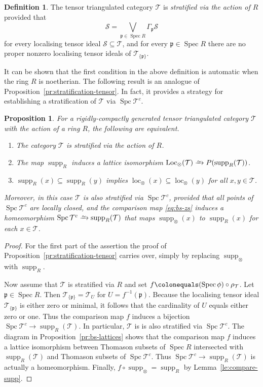 \documentclass{amsart}[a4]
\newtheorem{proposition}[theorem]{Proposition}
\theoremstyle{definition}
\newtheorem{definition}[theorem]{Definition}
\theoremstyle{remark}
\numberwithin{equation}{section}
\newcommand{\loc}{\operatorname{loc}}
\newcommand{\Loc}{\operatorname{Loc}}
\newcommand{\Spc}{\operatorname{Spc}}
\newcommand{\Spec}{\operatorname{Spec}}
\newcommand{\supp}{\operatorname{supp}}
\newcommand{\iso}{\xrightarrow{\raisebox{-.6ex}[0ex][0ex]{$\scriptstyle{\sim}$}}}
\newcommand{\cat}{\mathcal}
\newcommand{\fp}{\mathfrak{p}}
\let\Gamma\varGamma
\begin{document}
\begin{definition}
  The tensor triangulated category $\cat T$ is \emph{stratified via
    the action of $R$} provided that
  \[\cat S=\bigvee_{\fp\in\Spec R}\Gamma_\fp\cat S\] for every
  localising tensor ideal $\cat S\subseteq \cat T$, and for every
  $\fp\in\Spec R$ there are no proper nonzero localising tensor ideals
  of $\cat T_{\{\fp\}}$.
\end{definition}

It can be shown that the first condition in the above definition is
automatic when the ring $R$ is noetherian. The following result is an
analogue of Proposition~\ref{pr:stratification-tensor}. In fact, it
provides a strategy for establishing a stratification of $\cat T$ via
$\Spc\cat T^c$.

\begin{proposition}\label{pr:stratification-ring}
  For a rigidly-compactly generated tensor triangulated category
  $\cat T$ with the action of a ring $R$, the following are equivalent.
\begin{enumerate}
\item The category $\cat T$ is stratified via the action of $R$.
\item The map $\supp_R$ induces
  a lattice isomorphism $\Loc_\otimes(\cat T)\iso P(\supp_R(\cat T))$.
\item $\supp_R(x)\subseteq\supp_R(y)$ implies
  $\loc_\otimes(x)\subseteq\loc_\otimes(y)$ for all $x,y\in\cat T$.
\end{enumerate}
Moreover, in this case $\cat T$ is also stratified via $\Spc\cat T^c$,
provided that all points of $\Spc\cat T^c$ are locally closed, and the
comparison map \eqref{eq:bs-zs} induces a homeomorphism  $\Spc\cat
T^c\iso\supp_R(\cat T)$ that maps $\supp_\otimes(x)$ to $\supp_R(x)$
for each $x\in\cat T$.
\end{proposition}
\begin{proof}
  For the first part of the assertion the proof of
  Proposition~\ref{pr:stratification-tensor} carries over, simply by
  replacing $\supp_\otimes$ with $\supp_R$.

  Now assume that $\cat T$ is stratified via $R$ and set
  $f\colonequals (\Spec\phi)\circ\rho_\cat T$. Let $\fp\in\Spec R$.
  Then $\cat T_{\{\fp\}}=\cat T_U$ for $U= f^{-1} (\fp)$. Because the
  localising tensor ideal $\cat T_{\{\fp\}}$ is either zero or
  minimal, it follows that the cardinality of $U$ equals either zero
  or one. Thus the comparison map $f$ induces a bijection
  $\Spc\cat T^c\to\supp_R(\cat T)$. In particular, $\cat T$ is is also
  stratified via $\Spc\cat T^c$. The diagram in
  Proposition~\ref{pr:bs-lattices} shows that the comparison map $f$
  induces a lattice isomorphism between Thomason subsets of $\Spec R$
  intersected with $\supp_R(\cat T)$ and Thomason subsets of
  $\Spc\cat T^c$. Thus $\Spc\cat T^c\to\supp_R(\cat T)$ is actually a
  homeomorphism. Finally, $f\circ\supp_\otimes=\supp_R$ by
  Lemma~\ref{le:compare-supp}.
\end{proof}  
\end{document}

